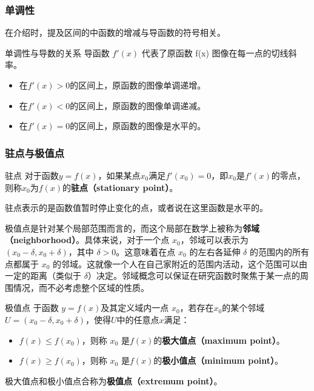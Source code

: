 \subsubsection{单调性}
在介绍时，提及区间的中函数的增减与导函数的符号相关。
\begin{theorem}{单调性与导数的关系}
导函数  $f'(x)$  代表了原函数  f(x)  图像在每一点的切线斜率。
\begin{itemize}
\item 在$f'(x)>0$的区间上，原函数的图像单调递增。
\item 在$f'(x)<0$的区间上，原函数的图像单调递减。
\item 在$f'(x)=0$的区间上，原函数的图像是水平的。
\end{itemize}
\end{theorem}


\subsubsection{驻点与极值点}

\begin{definition}{驻点}
对于函数$y=f(x)$，如果某点$x_0$满足$f'(x_0)=0$，即$x_0$是$f'(x)$的零点，则称$x_0$为$f(x)$的\textbf{驻点（stationary point）}。
\end{definition}

驻点表示的是函数值暂时停止变化的点，或者说在这里函数是水平的。

极值点是针对某个局部范围而言的，而这个局部在数学上被称为\textbf{邻域（neighborhood）}。具体来说，对于一个点 $x_0$，邻域可以表示为 $\left( x_0 - \delta, x_0 + \delta \right)$，其中 $\delta > 0$。这意味着在点 $x_0$ 的左右各延伸 $\delta$ 的范围内的所有点都属于 $x_0$ 的邻域。这就像一个人在自己家附近的范围内活动，这个范围可以由一定的距离（类似于 $\delta$）决定。邻域概念可以保证在研究函数时聚焦于某一点的周围情况，而不必考虑整个区域的性质。

\begin{definition}{极值点}
于函数 $y=f(x)$及其定义域内一点 $x_0$，若存在$x_0$的某个邻域$U=\left( x_0-\delta,x_0+\delta \right)$，使得$U$中的任意点$x$满足：
\begin{itemize}
\item $f(x) \leq f\left(x_0\right)$，则称 $x_0$ 是$f(x)$的\textbf{极大值点（maximum point）}。
\item $f(x) \geq f\left(x_0\right)$，则称 $x_0$ 是$f(x)$的\textbf{极小值点（minimum point）}。
\end{itemize}
极大值点和极小值点合称为\textbf{极值点（extremum point）}。
\end{definition}

